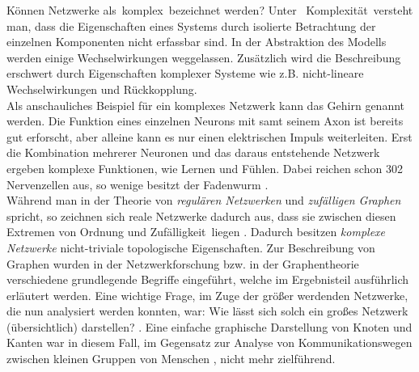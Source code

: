 \documentclass[fontsize=11pt, twoside, a4paper]{scrartcl}
\begin{document}
Können Netzwerke als \,\glqq komplex\grqq\, bezeichnet werden? Unter \, \glqq Komplexität\grqq\, versteht man, dass die Eigenschaften eines Systems durch isolierte Betrachtung der einzelnen Komponenten nicht erfassbar sind. In der Abstraktion des Modells werden einige Wechselwirkungen weggelassen. Zusätzlich wird die Beschreibung erschwert durch Eigenschaften komplexer Systeme wie z.B. nicht-lineare Wechselwirkungen und Rückkopplung.\\
Als anschauliches Beispiel für ein komplexes Netzwerk kann das Gehirn genannt werden. Die Funktion eines einzelnen Neurons mit samt seinem Axon ist bereits gut erforscht, aber alleine kann es nur einen elektrischen Impuls weiterleiten. Erst die Kombination mehrerer Neuronen und das daraus entstehende Netzwerk ergeben komplexe Funktionen, wie Lernen und Fühlen. Dabei reichen schon 302 Nervenzellen aus, so wenige besitzt der Fadenwurm \cite{SpektrumWissenschaft}. \\[\baselineskip]
Während man in der Theorie von \textit{regulären Netzwerken} und \textit{zufälligen Graphen} spricht, so zeichnen sich reale Netzwerke dadurch aus, dass sie \glqq zwischen diesen Extremen von Ordnung und Zufälligkeit\grqq \, liegen \cite{ExploringNetworks}. Dadurch besitzen \textit{komplexe Netzwerke} nicht-triviale topologische Eigenschaften. Zur Beschreibung von Graphen wurden in der Netzwerkforschung bzw. in der Graphentheorie verschiedene grundlegende Begriffe eingeführt, welche im Ergebnisteil  ausführlich erläutert werden.
Eine wichtige Frage, im Zuge der größer werdenden Netzwerke, die nun analysiert werden konnten, war: Wie lässt sich solch ein großes Netzwerk (übersichtlich) darstellen? \cite{Newman}. Eine einfache graphische Darstellung von Knoten und Kanten war in diesem Fall, im Gegensatz zur Analyse von Kommunikationswegen zwischen kleinen Gruppen von Menschen \cite{ValdisKrebs}, nicht mehr zielführend.\\[\baselineskip]
\end{document}
